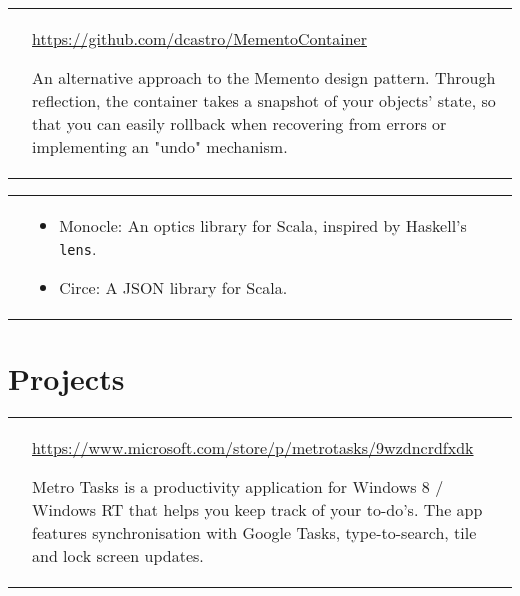 \documentclass[12pt,a4paper,sans]{moderncv}        %
\makeatletter
\newcommand*{\para}{\vspace{.7ex}\newline}
\newcommand*{\project}[3]{
  \cvitem{\textbf{#1}}{
    \barelink{#2}
    \para
    #3
    }
}
\newcommand*{\code}{\texttt}
\newcommand*{\barelink}[1]{\protect\href{#1}{#1}}
\newcommand*{\cvitemspace}{1em}
\renewcommand*{\cvitem}[3][\cvitemspace]{%
  \begin{tabular}{@{}p{\hintscolumnwidth}@{\hspace{\separatorcolumnwidth}}p{\maincolumnwidth}@{}}%
    \raggedleft\hintstyle{#2} &{#3}%
  \end{tabular}%
  \par\addvspace{#1}}
\makeatother
\begin{document}
\project{MementoContainer}{https://github.com/dcastro/MementoContainer}{
  An alternative approach to the Memento design pattern. Through reflection,
  the container takes a snapshot of your objects' state, so that you can easily
  rollback when recovering from errors or implementing an "undo" mechanism.
}
\cvitem{\textbf{Smaller contributions}}{
  \begin{itemize}
    \item Monocle: An optics library for Scala, inspired by Haskell's \code{lens}.
    \item Circe: A JSON library for Scala.
  \end{itemize}
}

\section{Projects}
\project{MetroTasks}{https://www.microsoft.com/store/p/metrotasks/9wzdncrdfxdk}{
  Metro Tasks is a productivity application for Windows 8 / Windows RT that
  helps you keep track of your to-do's. The app features synchronisation with
  Google Tasks, type-to-search, tile and lock screen updates.
}
\end{document}
